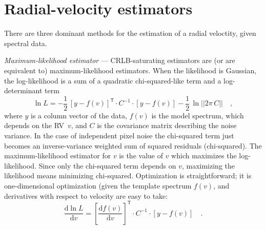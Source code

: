 \documentclass[modern]{aastex631}
\newcommand{\dd}{\mathrm{d}}
\newcommand{\T}{^{\mathsf{T}}}
\renewcommand{\paragraph}[1]{\bigskip\par\noindent\textsl{#1} ---}
\newcommand{\acronym}[1]{{\small{#1}}}
\newcommand{\RV}{\acronym{RV}}
\newcommand{\CRLB}{\acronym{CRLB}}
\begin{document}
\section{Radial-velocity estimators}
\label{s:methods}

There are three dominant methods for the estimation of a radial veloctity,
given spectral data.

\paragraph{Maximum-likelihood estimator}
\CRLB-saturating estimators are (or are equivalent to)
maximum-likelihood estimators.
When the likelihood is Gaussian, the log-likelihood
is a sum of a quadratic chi-squared-like term and a log-determinant term
\begin{equation}
\ln L = -\frac{1}{2}\,[y - f(v)]\T\cdot C^{-1}\cdot [y - f(v)] - \frac{1}{2}\,\ln||2\pi\,C||
\quad ,
\label{eq:lf}
\end{equation}
where $y$ is a column vector of the data, $f(v)$ is the model spectrum,
which depends on the \RV\ $v$,
and $C$ is the covariance matrix describing the noise variance.
In the case of independent pixel noise the chi-squared term just becomes an
inverse-variance weighted sum of squared residuals (chi-squared).
The maximum-likelihood estimator for $v$ is the value of $v$ which maximizes
the log-likelihood.
Since only the chi-squared term depends on $v$, maximizing the likelihood
means minimizing chi-squared.
Optimization is straightforward; it is one-dimensional optimization
(given the template spectrum $f(v)$, and derivatives with respect to
velocity are easy to take:
\begin{equation}
\frac{\dd\ln L}{\dd v} = [\frac{\dd f(v)}{\dd v}]\T\cdot C^{-1}\cdot [y - f(v)]
\quad .
\label{eq:dldv}
\end{equation}
\end{document}

